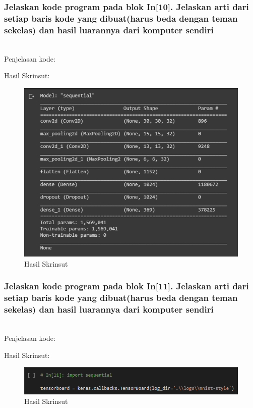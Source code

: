 \subsubsection{Jelaskan kode program pada blok  In[10]. Jelaskan arti dari setiap baris kode yang dibuat(harus beda dengan teman sekelas) dan hasil luarannya dari komputer sendiri}
\hfill\\
Penjelasan kode:

Hasil Skrinsut:
\begin{figure}[H]
	\centering
	\includegraphics[scale=0.5]{figures/1174083/figures7/p10.png}
	\caption{Hasil Skrinsut}
\end{figure}

\subsubsection{Jelaskan kode program pada blok  In[11]. Jelaskan arti dari setiap baris kode yang dibuat(harus beda dengan teman sekelas) dan hasil luarannya dari komputer sendiri}
\hfill\\
Penjelasan kode:

Hasil Skrinsut:
\begin{figure}[H]
	\centering
	\includegraphics[scale=0.5]{figures/1174083/figures7/p11.png}
	\caption{Hasil Skrinsut}
\end{figure}



